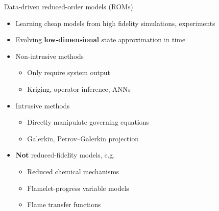 \documentclass[]{beamer}
\begin{document}
\begin{frame}{Data-driven reduced-order models (ROMs)}
	\begin{itemize}
		\item Learning cheap models from high fidelity simulations, experiments
		\item Evolving \textbf{low-dimensional} state approximation in time
		\item Non-intrusive methods
		\begin{itemize}
			\item Only require system output
			\item Kriging, operator inference, ANNs
		\end{itemize}
		\item Intrusive methods
		\begin{itemize}
			\item Directly manipulate governing equations
			\item Galerkin, Petrov--Galerkin projection
		\end{itemize}
		\item \textbf{Not} reduced-fidelity models, e.g.
		\begin{itemize}
			\item Reduced chemical mechanisms
			\item Flamelet-progress variable models
			\item Flame transfer functions
		\end{itemize}
	\end{itemize}
\end{frame}
\end{document}
